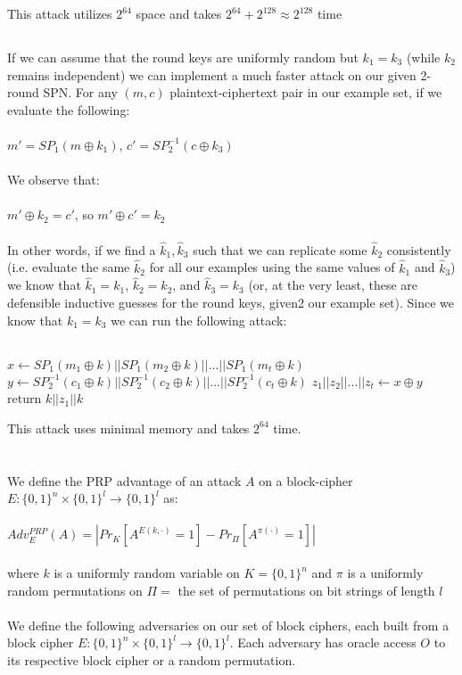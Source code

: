 \documentclass[]{article}
\begin{document}
This attack utilizes $2^{64}$ space and takes $2^{64} + 2^{128} \approx 2^{128}$ time
\subsection{}
If we can assume that the round keys are uniformly random but $k_1 = k_3$ (while $k_2$ remains independent) we can implement a much faster attack on our given 2-round SPN. For any $(m, c)$ plaintext-ciphertext pair in our example set, if we evaluate the following:
\\\\
$m' = SP_1(m \oplus k_1)$, $c' = SP_2^{-1}(c \oplus k_3)$
\\\\
We observe that:
\\\\
$m' \oplus k_2 = c'$, so $m' \oplus c' = k_2$
\\\\
In other words, if we find a $\hat{k}_1, \hat{k}_3$ such that we can replicate some $\hat{k}_2$ consistently (i.e. evaluate the same $\hat{k}_2$ for all our examples using the same values of $\hat{k}_1$ and $\hat{k}_3$) we know that $\hat{k}_1 = k_1$, $\hat{k}_2 = k_2$, and  $\hat{k}_3 = k_3$ (or, at the very least, these are defensible inductive guesses for the round keys, given2 our example set). Since we know that $k_1 = k_3$ we can run the following attack:
\\\\
\begin{algorithm}[H]
	\SetAlgoLined
	 {
		$x \leftarrow SP_1(m_1 \oplus k) || SP_1(m_2 \oplus k) || ... || SP_1(m_t \oplus k)$\;
		$y \leftarrow SP_2^{-1}(c_1 \oplus k) || SP_2^{-1}(c_2 \oplus k) || ... || SP_2^{-1}(c_t \oplus k)$\;
		$z_1 || z_2 || ... || z_t \leftarrow x \oplus y$\;
		 {
			return $k || z_1 || k$
		}
	}
	\caption{$Attack((m_1,c_1),(m_2, c_2), ..., (m_t, c_t))$}
\end{algorithm}
This attack uses minimal memory and takes $2^{64}$ time.

\section{}
We define the PRP advantage of an attack $A$ on a block-cipher $E: \{0,1\}^n \times \{0, 1\}^l \rightarrow \{0,1\}^l$ as:
\\\\
$Adv_E^{PRP}(A) = |Pr_K[A^{E(k, \cdot)} = 1] - Pr_\Pi[A^{\pi(\cdot)} = 1]|$
\\\\
where $k$ is a uniformly random variable on $K = \{0,1\}^n$ and $\pi$ is a uniformly random permutations on $\Pi = $ the set of permutations on bit strings of length $l$
\\\\
We define the following adversaries on our set of block ciphers, each built from a block cipher $E: \{0,1\}^n \times \{0, 1\}^l \rightarrow \{0,1\}^l$. Each adversary has oracle access $O$ to its respective block cipher or a random permutation.
\end{document}
